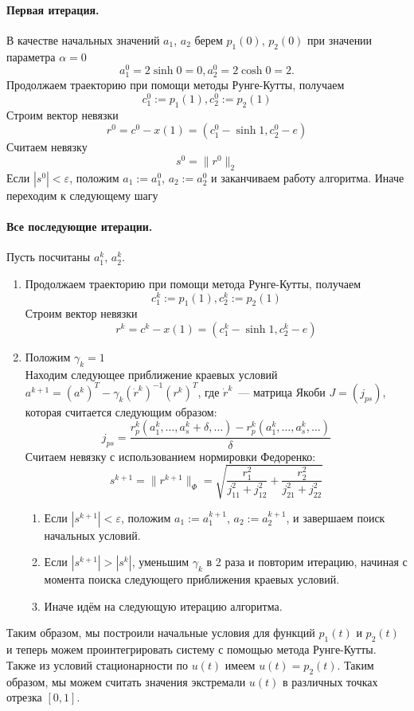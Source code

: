 \documentclass[24pt]{article}
\begin{document}
\paragraph{Первая итерация.}

В качестве начальных значений $a_1$, $a_2$ берем $p_1(0)$, $p_2(0)$ при значении параметра $\alpha = 0$
$$ a_1^0 = 2\sinh 0 = 0, a_2^0 = 2\cosh 0 = 2.$$
Продолжаем траекторию при помощи методы Рунге-Кутты, получаем
$$c_1^0 := p_1(1), c_2^0 := p_2(1)$$
Строим вектор невязки
$$r^0 = c^0 - x(1) = \left(c_1^0 - \sinh 1, c_2^0 - e\right)$$
Считаем невязку
$$s^0 = \|r^0\|_2$$
Если $\left|s^0\right| < \varepsilon$, положим $a_1 := a_1^0$, $a_2 := a_2^0$ и заканчиваем работу алгоритма. Иначе переходим к следующему шагу
\paragraph{Все последующие итерации.}
Пусть посчитаны $a_1^k$, $a_2^k$.
\begin{enumerate}
\item
Продолжаем траекторию при помощи метода Рунге-Кутты, получаем
$$c_1^k := p_1(1), c_2^k := p_2(1)$$
Строим вектор невязки
$$r^k = c^k - x(1) = \left(c_1^k - \sinh 1, c_2^k - e\right)$$
\item
Положим $\gamma_k = 1$\\
Находим следующее приближение краевых условий
$a^{k+1} = \left(a^k\right)^T - \gamma_k\left(\dot r^k\right)^{-1}\left(r^k\right)^T$, где
$\dot r^k$~--- матрица Якоби $J = \left(j_{ps}\right)$, которая считается следующим образом:
$$j_{ps} = \frac{r^k_p\left(a^k_1,\ldots,a_s^k + \delta, \ldots\right) - r^k_p\left(a^k_1,\ldots,a_s^k, \ldots\right)}{\delta}$$
Считаем невязку с использованием нормировки Федоренко:
$$s^{k+1} = \|r^{k+1}\|_\Phi = \sqrt{\frac{r_1^2}{j_{11}^2+j_{12}^2} + \frac{r_2^2}{j_{21}^2+j_{22}^2} }$$
\begin{enumerate}
\item
Если $\left|s^{k+1}\right| < \varepsilon$, положим $a_1 := a_1^{k+1}$, $a_2 := a_2^{k+1}$, и завершаем поиск начальных условий.
\item
Если $\left|s^{k+1}\right| > \left|s^{k}\right|$, уменьшим $\gamma_k$ в 2 раза и повторим итерацию, начиная с момента поиска следующего приближения краевых условий. 
\item
Иначе идём на следующую итерацию алгоритма.
\end{enumerate}
\end{enumerate}
Таким образом, мы построили начальные условия для функций $p_1(t)$ и $p_2(t)$ и теперь можем проинтегрировать систему с помощью метода Рунге-Кутты.\\
Также из условий стационарности по $u(t)$ имеем $u(t) = p_2(t)$. Таким образом, мы можем считать значения экстремали $u(t)$ в различных точках отрезка $[0,1]$.
\end{document}
